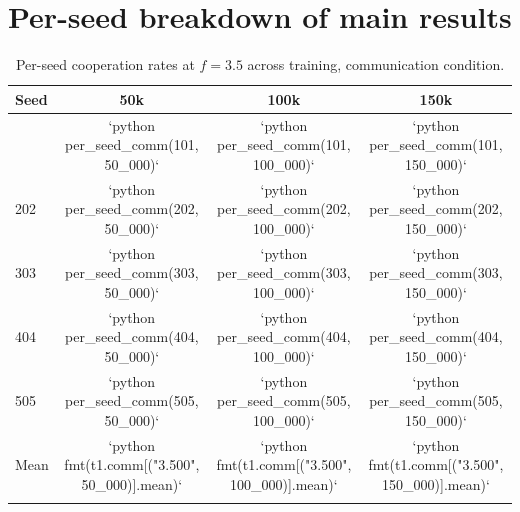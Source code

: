 \documentclass[
  10pt,
  letterpaper,
]{article}
\begin{document}
\hypertarget{sec-app-per-seed}{%
\section{Per-seed breakdown of main results}\label{sec-app-per-seed}}

\begin{table}[h]
  \caption{Per-seed cooperation rates at $f\!=\!3.5$ across training, communication condition.}
  
  \centering
  \small
  \begin{tabular}{lccc}
    \toprule
    Seed & 50k & 100k & 150k \\
    \midrule

\begin{verbatim}
101 & `{python} per_seed_comm(101, 50_000)` & `{python} per_seed_comm(101, 100_000)` & `{python} per_seed_comm(101, 150_000)` \\
202 & `{python} per_seed_comm(202, 50_000)` & `{python} per_seed_comm(202, 100_000)` & `{python} per_seed_comm(202, 150_000)` \\
303 & `{python} per_seed_comm(303, 50_000)` & `{python} per_seed_comm(303, 100_000)` & `{python} per_seed_comm(303, 150_000)` \\
404 & `{python} per_seed_comm(404, 50_000)` & `{python} per_seed_comm(404, 100_000)` & `{python} per_seed_comm(404, 150_000)` \\
505 & `{python} per_seed_comm(505, 50_000)` & `{python} per_seed_comm(505, 100_000)` & `{python} per_seed_comm(505, 150_000)` \\
\midrule
Mean & `{python} fmt(t1.comm[("3.500", 50_000)].mean)` & `{python} fmt(t1.comm[("3.500", 100_000)].mean)` & `{python} fmt(t1.comm[("3.500", 150_000)].mean)` \\
\end{verbatim}

    \bottomrule
  \end{tabular}
\end{table}
\end{document}
